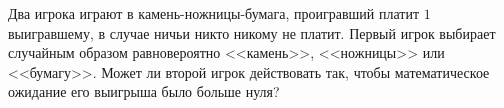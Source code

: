 Два игрока играют в камень-ножницы-бумага, проигравший платит $1$ выигравшему, в случае ничьи никто никому не платит. Первый
игрок выбирает случайным образом равновероятно <<камень>>, <<ножницы>> или <<бумагу>>. Может ли второй игрок действовать так,
чтобы математическое ожидание его выигрыша было больше нуля?